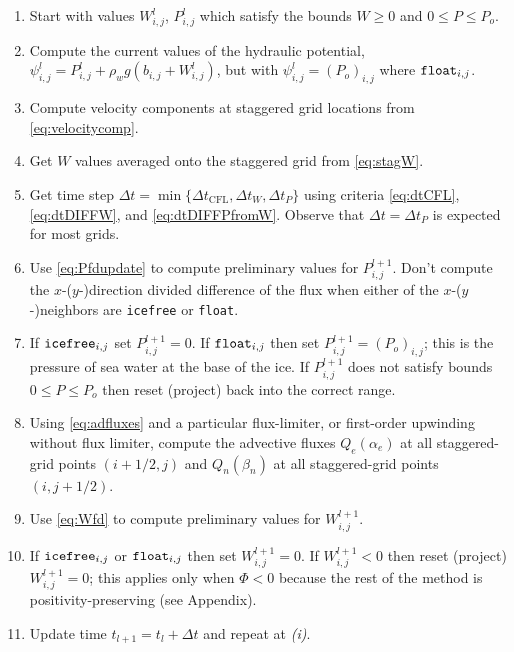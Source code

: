 \documentclass[11pt,final]{amsart}%
\newcommand{\Wlij}{W^l_{i,j}}
\newcommand{\Plij}{P^l_{i,j}}
\begin{document}
\bigskip\medskip
\renewcommand{\labelenumi}{\emph{(\roman{enumi})}}
\begin{enumerate}
\item Start with values $\Wlij$, $\Plij$ which satisfy the bounds $W\ge 0$ and $0 \le P \le P_o$.
\item Compute the current values of the hydraulic potential, $\psi_{i,j}^l = \Plij + \rho_w g(b_{i,j} + \Wlij)$, but with $\psi_{i,j}^l=(P_o)_{i,j}$ where $\text{\texttt{float}}_{i,j}$.
\item Compute velocity components at staggered grid locations from \eqref{eq:velocitycomp}.   \item Get $W$ values averaged onto the staggered grid from \eqref{eq:stagW}.
\item Get time step $\Delta t = \min\{\Delta t_{\text{CFL}}, \Delta t_W, \Delta t_P\}$ using criteria \eqref{eq:dtCFL}, \eqref{eq:dtDIFFW}, and \eqref{eq:dtDIFFPfromW}.  Observe that $\Delta t = \Delta t_P$ is expected for most grids.
\item Use \eqref{eq:Pfdupdate} to compute preliminary values for $P_{i,j}^{l+1}$.  Don't compute the $x$-($y$-)direction divided difference of the flux when either of the $x$-($y$-)neighbors are \texttt{icefree} or \texttt{float}.
\item If $\text{\texttt{icefree}}_{i,j}$ set $P_{i,j}^{l+1}=0$.  If $\text{\texttt{float}}_{i,j}$ then set $P_{i,j}^{l+1} = (P_o)_{i,j}$; this is the pressure of sea water at the base of the ice.  If $P_{i,j}^{l+1}$ does not satisfy bounds $0 \le P \le P_o$ then reset (project) back into the correct range.
\item Using \eqref{eq:adfluxes} and a particular flux-limiter, or first-order upwinding without flux limiter, compute the advective fluxes $Q_e(\alpha_e)$ at all staggered-grid points $(i+1/2,j)$ and $Q_n(\beta_n)$ at all staggered-grid points $(i,j+1/2)$.  
\item Use \eqref{eq:Wfd} to compute preliminary values for $W_{i,j}^{l+1}$.
\item If $\text{\texttt{icefree}}_{i,j}$ or $\text{\texttt{float}}_{i,j}$ then set $W_{i,j}^{l+1}=0$.  If $W_{i,j}^{l+1}<0$ then reset (project) $W_{i,j}^{l+1}=0$; this applies only when $\Phi<0$ because the rest of the method is positivity-preserving (see Appendix).
\item Update time $t_{l+1}=t_l+\Delta t$ and repeat at \emph{(i)}.
\end{enumerate}
\end{document}
